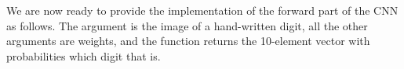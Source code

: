 We are now ready to provide the implementation of the forward part of the CNN
as follows.  The  argument is the image of a hand-written digit, all
the other arguments are weights, and the function returns the 10-element vector
with probabilities which digit that is.
\begin{mathpar}
\end{mathpar}
